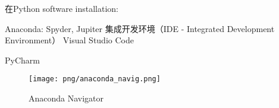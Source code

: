 \documentclass[main.tex]{subfiles}
\begin{document}
在Python software installation:

Anaconda: Spyder, Jupiter
集成开发环境（IDE - Integrated Development Environment）
Visual Studio Code

PyCharm

\begin{figure}[h]
	\centering
	\texttt{[image: png/anaconda\_navig.png]}
	\caption{Anaconda Navigator}
	\label{fig:III.1.3}
\end{figure}

\newpage
\end{document}
